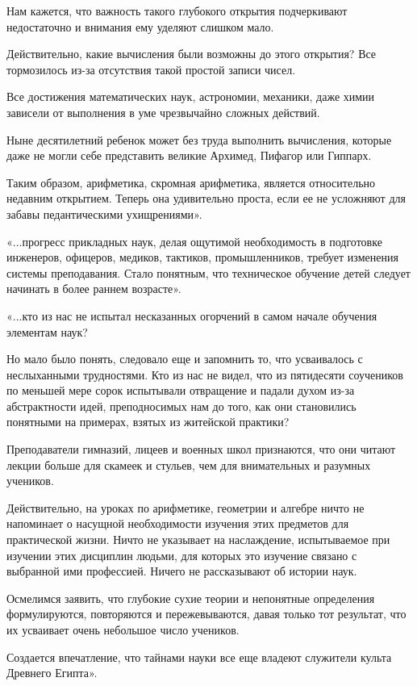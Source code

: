 \documentclass[12pt, a4paper, openany]{book}
\begin{document}
Нам кажется, что важность такого глубокого открытия подчеркивают недостаточно и внимания ему уделяют  слишком мало. 

Действительно, какие вычисления были возможны до этого открытия? Все тормозилось из-за отсутствия такой простой записи чисел. 

Все достижения математических наук, астрономии,  механики, даже химии зависели от выполнения в уме  чрезвычайно сложных действий. 

Ныне десятилетний ребенок может без труда выполнить вычисления, которые даже не могли себе представить  великие Архимед, Пифагор или Гиппарх. 

Таким образом, арифметика, скромная арифметика, является относительно недавним открытием. Теперь она удивительно проста, если ее не усложняют для забавы педантическими ухищрениями». 

«...прогресс прикладных наук, делая ощутимой  необходимость в подготовке инженеров, офицеров, медиков, тактиков, промышленников, требует изменения системы преподавания. Стало понятным, что техническое обучение детей следует начинать в более раннем возрасте». 

«...кто из нас не испытал несказанных огорчений в  самом начале обучения элементам наук? 

Но мало было понять, следовало еще и запомнить то, что усваивалось с неслыханными трудностями. Кто из нас не видел, что из пятидесяти соучеников по меньшей мере сорок испытывали отвращение и падали духом из-за абстрактности идей, преподносимых нам до того, как они становились понятными на примерах, взятых из  житейской практики? 

Преподаватели гимназий, лицеев и военных школ  признаются, что они читают лекции больше для скамеек и стульев, чем для внимательных и разумных учеников. 

Действительно, на уроках по арифметике, геометрии и алгебре ничто не напоминает о насущной необходимости изучения этих предметов для практической жизни. Ничто не указывает на наслаждение, испытываемое при изучении этих дисциплин людьми, для которых это изучение связано с выбранной ими профессией. Ничего не рассказывают об истории наук. 

Осмелимся заявить, что глубокие сухие теории и  непонятные определения формулируются, повторяются и  пережевываются, давая только тот результат, что их  усваивает очень небольшое число учеников. 

Создается впечатление, что тайнами науки все еще владеют служители культа Древнего Египта». 
\end{document}
